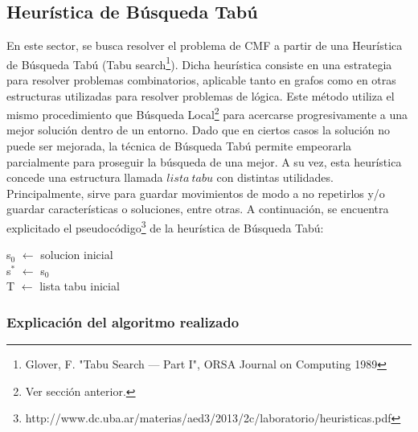 \subsection{Heurística de Búsqueda Tabú}

En este sector, se busca resolver el problema de CMF a partir de una Heurística de Búsqueda Tabú (Tabu search\footnote{Glover, F. "Tabu Search — Part I", ORSA Journal on Computing 1989}). Dicha heurística consiste en una estrategia para resolver problemas combinatorios, aplicable tanto en grafos como en otras estructuras utilizadas para resolver problemas de lógica. Este método utiliza el mismo procedimiento que Búsqueda Local\footnote{Ver sección anterior.} para acercarse progresivamente a una mejor solución dentro de un entorno. Dado que en ciertos casos la solución no puede ser mejorada, la técnica de Búsqueda Tabú permite empeorarla parcialmente para proseguir la búsqueda de una mejor. A su vez, esta heurística concede una estructura llamada $lista\ tabu$ con distintas utilidades. Principalmente, sirve para guardar movimientos de modo a no repetirlos y/o guardar características o soluciones, entre otras. A continuación, se encuentra explicitado el pseudocódigo\footnote{http://www.dc.uba.ar/materias/aed3/2013/2c/laboratorio/heuristicas.pdf} de la heurística de Búsqueda Tabú:

\begin{algorithm}[H]
\SetAlgoLined
s$_{0}$ $\leftarrow$ solucion inicial \\
s$^{*}$ $\leftarrow$ s$_{0}$ \\
T $\leftarrow$ lista tabu inicial \\
\end{algorithm}

\subsubsection{Explicación del algoritmo realizado}

